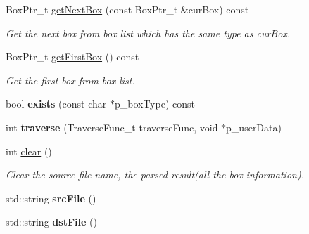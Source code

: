\begin{DoxyCompactItemize}
Box\+Ptr\+\_\+t \mbox{\hyperlink{classmp4_parser_1_1_m_p4_parser_a3ca2c14303ef53c0e3a2abe72d22c017}{get\+Next\+Box}} (const Box\+Ptr\+\_\+t \&cur\+Box) const
\begin{DoxyCompactList}\small\item\em Get the next box from box list which has the same type as cur\+Box. \end{DoxyCompactList}\item 
\mbox{\label{classmp4_parser_1_1_m_p4_parser_a06442051ce3c360ab2842d5a2872989b}} 
Box\+Ptr\+\_\+t \mbox{\hyperlink{classmp4_parser_1_1_m_p4_parser_a06442051ce3c360ab2842d5a2872989b}{get\+First\+Box}} () const
\begin{DoxyCompactList}\small\item\em Get the first box from box list. \end{DoxyCompactList}\item 
\mbox{\label{classmp4_parser_1_1_m_p4_parser_a8c9f66c274d356b51afe9b62df9b7cf3}} 
bool {\bfseries exists} (const char $\ast$p\+\_\+box\+Type) const
\item 
\mbox{\label{classmp4_parser_1_1_m_p4_parser_a2c16e9ca43b6ba80d08da4047622160d}} 
int {\bfseries traverse} (Traverse\+Func\+\_\+t traverse\+Func, void $\ast$p\+\_\+user\+Data)
\item 
\mbox{\label{classmp4_parser_1_1_m_p4_parser_af1f298af86932b58b3677722b49736c0}} 
int \mbox{\hyperlink{classmp4_parser_1_1_m_p4_parser_af1f298af86932b58b3677722b49736c0}{clear}} ()
\begin{DoxyCompactList}\small\item\em Clear the source file name, the parsed result(all the box information). \end{DoxyCompactList}\item 
\mbox{\label{classmp4_parser_1_1_m_p4_parser_ad62a065a468987b648eedaba718f8a0d}} 
std\+::string {\bfseries src\+File} ()
\item 
\mbox{\label{classmp4_parser_1_1_m_p4_parser_a637db83f72f76903625b82ea8d3a3560}} 
std\+::string {\bfseries dst\+File} ()
\item 

\end{DoxyCompactItemize}
